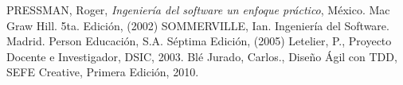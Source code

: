 \begin{thebibliography}{99}
		 PRESSMAN, Roger, \emph{Ingeniería del software un enfoque práctico}, México. Mac Graw Hill. 5ta. Edición, (2002)
		SOMMERVILLE, Ian. Ingeniería del Software. Madrid. Person Educación, S.A. Séptima Edición, (2005)
		Letelier, P., Proyecto Docente e Investigador, DSIC, 2003.
		Blé Jurado, Carlos., Diseño Ágil con TDD, SEFE Creative, Primera Edición, 2010.
	\end{thebibliography}